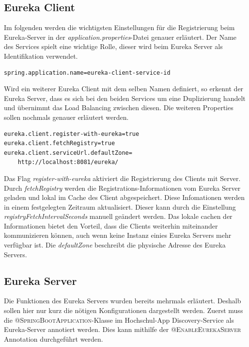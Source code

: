 \subsection*{Eureka Client}

Im folgenden werden die wichtigsten Einstellungen für die Registrierung beim Eureka-Server in der \textit{application.properties}-Datei genauer erläutert. Der Name des Services spielt eine wichtige Rolle, dieser wird beim Eureka Server als Identifikation verwendet.
\begin{lstlisting}[caption={Spring Name in \textit{application.properties} Datei}, label={code:name}]
spring.application.name=eureka-client-service-id
\end{lstlisting}
Wird ein weiterer Eureka Client mit dem selben Namen definiert, so erkennt der Eureka Server, dass es sich bei den beiden Services um eine Duplizierung handelt und übernimmt das Load Balancing zwischen diesen. Die weiteren Properties sollen nochmals genauer erläutert werden.

\begin{lstlisting}[caption={Eureka Client Einstellungen aus \textit{application.properties} Datei}, label={code:eurekaclient}]
eureka.client.register-with-eureka=true
eureka.client.fetchRegistry=true
eureka.client.serviceUrl.defaultZone=
	http://localhost:8081/eureka/
\end{lstlisting}

Das Flag \textit{register-with-eureka} aktiviert die Registrierung des Clients mit Server. Durch \textit{fetchRegistry} werden die Registrations-Informationen vom Eureka Server geladen und lokal im Cache des Client abgespeichert. Diese Infomationen werden in einem festgelegten Zeitraum aktualisiert. Dieser kann durch die Einstellung \textit{registryFetchIntervalSeconds} manuell geändert werden. Das lokale cachen der Informationen bietet den Vorteil, dass die Clients weiterhin miteinander kommunizieren können, auch wenn keine Instanz einies Eureka Servers mehr verfügbar ist. Die \textit{defaultZone} beschreibt die physische Adresse des Eureka Servers.

\subsection*{Eureka Server}

Die Funktionen des Eureka Servers wurden bereits mehrmals erläutert. Deshalb sollen hier nur kurz die nötigen Konfigurationen dargestellt werden. Zuerst muss die \textsc{@SpringBootApplication}-Klasse im Hochschul-\ac{App} Discovery-Service als Eureka-Server annotiert werden. Dies kann mithilfe der \textsc{@EnableEurekaServer} Annotation durchgeführt werden.

